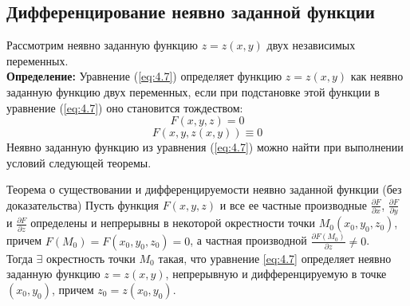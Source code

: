 \subsection{Дифференцирование неявно заданной функции} \label{part:2.8}

Рассмотрим неявно заданную функцию $z = z(x,y)$ двух независимых переменных.\\

\textbf{Определение:} Уравнение (\ref{eq:4.7}) определяет функцию $z = z(x,y)$ как неявно заданную функцию двух переменных, если при подстановке этой функции в уравнение (\ref{eq:4.7}) оно становится тождеством:
\begin{equation} \label{eq:4.7}
	F(x,y,z) = 0
\end{equation}
\begin{equation} \label{eq:4.8}
	F(x,y,z(x,y)) \equiv 0
\end{equation}
Неявно заданную функцию из уравнения (\ref{eq:4.7}) можно найти при выполнении условий следующей теоремы.

\begin{tbox}{Теорема о существовании и дифференцируемости неявно заданной функции (без доказательства)}
	Пусть функция $F(x,y,z)$ и все ее частные производные $\frac{\partial F}{\partial x}$, $\frac{\partial F}{\partial y}$ и $\frac{\partial F}{\partial z}$ определены и непрерывны в некоторой окрестности точки $M_0(x_0,y_0, z_0)$, причем $F(M_0) = F(x_0, y_0, z_0) = 0$, а частная производной $\frac{\partial F(M_0)}{\partial z} \neq 0$.\\

	Тогда $\exists$ окрестность точки $M_0$ такая, что уравнение \eqref{eq:4.7} определяет неявно заданную функцию $z = z(x,y)$, непрерывную и дифференцируемую в точке $(x_0, y_0)$, причем $z_0 = z(x_0, y_0)$.
\end{tbox}

